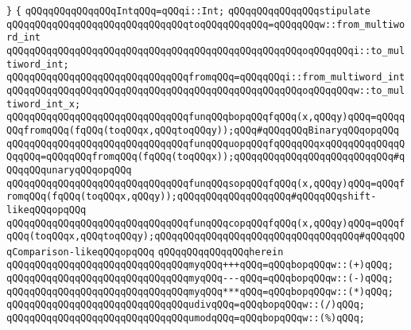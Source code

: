 \verb|}|\newline
\verb|{|\newline
\verb|qQQqqQQqqQQqqQQqIntqQQq=qQQqi::Int;|\newline
\newline
\verb|qQQqqQQqqQQqqQQqstipulate|\newline
\verb|qQQqqQQqqQQqqQQqqQQqqQQqqQQqqQQqtoqQQqqQQqqQQq=qQQqqQQqw::from_multiword_int|\newline
\verb|qQQqqQQqqQQqqQQqqQQqqQQqqQQqqQQqqQQqqQQqqQQqqQQqqQQqoqQQqqQQqi::to_multiword_int;|\newline
\newline
\verb|qQQqqQQqqQQqqQQqqQQqqQQqqQQqqQQqfromqQQq=qQQqqQQqi::from_multiword_int|\newline
\verb|qQQqqQQqqQQqqQQqqQQqqQQqqQQqqQQqqQQqqQQqqQQqqQQqqQQqoqQQqqQQqw::to_multiword_int_x;|\newline
\newline
\verb|qQQqqQQqqQQqqQQqqQQqqQQqqQQqqQQqfunqQQqbopqQQqfqQQq(x,qQQqy)qQQq=qQQqqQQqfromqQQq(fqQQq(toqQQqx,qQQqtoqQQqy));qQQq#qQQqqQQqBinaryqQQqopqQQq|\newline
\verb|qQQqqQQqqQQqqQQqqQQqqQQqqQQqqQQqfunqQQquopqQQqfqQQqqQQqxqQQqqQQqqQQqqQQqqQQq=qQQqqQQqfromqQQq(fqQQq(toqQQqx));qQQqqQQqqQQqqQQqqQQqqQQqqQQq#qQQqqQQqunaryqQQqopqQQq|\newline
\newline
\verb|qQQqqQQqqQQqqQQqqQQqqQQqqQQqqQQqfunqQQqsopqQQqfqQQq(x,qQQqy)qQQq=qQQqfromqQQq(fqQQq(toqQQqx,qQQqy));qQQqqQQqqQQqqQQqqQQq#qQQqqQQqshift-likeqQQqopqQQq|\newline
\verb|qQQqqQQqqQQqqQQqqQQqqQQqqQQqqQQqfunqQQqcopqQQqfqQQq(x,qQQqy)qQQq=qQQqfqQQq(toqQQqx,qQQqtoqQQqy);qQQqqQQqqQQqqQQqqQQqqQQqqQQqqQQqqQQq#qQQqqQQqComparison-likeqQQqopqQQq|\newline
\verb|qQQqqQQqqQQqqQQqherein|\newline
\verb|qQQqqQQqqQQqqQQqqQQqqQQqqQQqqQQqmyqQQq+++qQQq=qQQqbopqQQqw::(+)qQQq;|\newline
\verb|qQQqqQQqqQQqqQQqqQQqqQQqqQQqqQQqmyqQQq---qQQq=qQQqbopqQQqw::(-)qQQq;|\newline
\verb|qQQqqQQqqQQqqQQqqQQqqQQqqQQqqQQqmyqQQq***qQQq=qQQqbopqQQqw::(*)qQQq;|\newline
\newline
\verb|qQQqqQQqqQQqqQQqqQQqqQQqqQQqqQQqudivqQQq=qQQqbopqQQqw::(/)qQQq;|\newline
\verb|qQQqqQQqqQQqqQQqqQQqqQQqqQQqqQQqumodqQQq=qQQqbopqQQqw::(%)qQQq;|\newline
\newline
